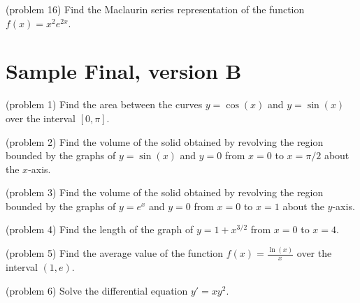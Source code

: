 \documentclass[handout]{ximera}
\begin{document}
\begin{problem}(problem 16)
Find the Maclaurin series representation of the function $f(x) = x^2 e^{2x}$.

\end{problem}






\section{Sample Final, version B}


\begin{problem}(problem 1) 
Find the area between the curves $y = \cos(x)$ and $y=\sin(x)$ over the interval $[0, \pi]$.

\end{problem}



\begin{problem}(problem 2)
Find the volume of the solid obtained by revolving the region bounded by the graphs of $y = \sin(x)$ and $y = 0$
from $x = 0$ to $x = \pi/2$ about the $x$-axis.

\end{problem}



\begin{problem}(problem 3)
Find the volume of the solid obtained by revolving the region bounded by the graphs of $y = e^x$ and $y = 0$
from $x = 0$ to $x = 1$ about the $y$-axis.

\end{problem}



\begin{problem}(problem 4)
Find the length of the graph of 
$y = 1+ x^{3/2}$ 
from  $x = 0$ to $x = 4$.

\end{problem}



\begin{problem}(problem 5)
Find the average value of the function $f(x) = \frac{\ln(x)}{x}$ over the interval $(1,e)$.

\end{problem}



\begin{problem}(problem 6)
Solve the differential equation $y' = xy^2$.

\end{problem}
\end{document}
